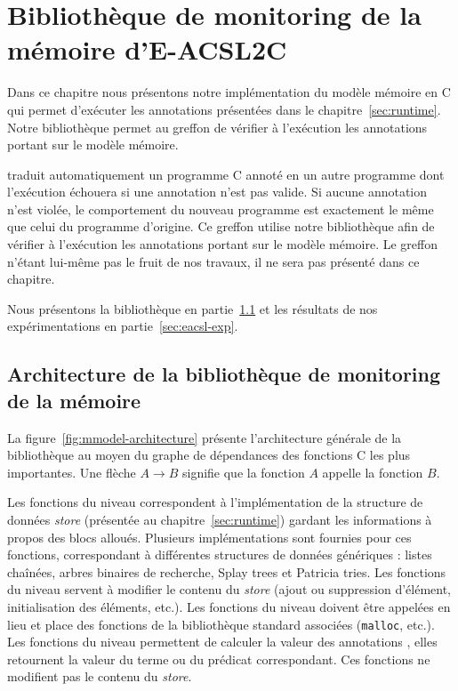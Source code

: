 
\chapter{Bibliothèque de monitoring de la mémoire d'E-ACSL2C}
\label{sec:eacsl}

\chapterintro


Dans ce chapitre nous présentons notre implémentation du modèle mémoire en C
qui permet d'exécuter les annotations \eacsl présentées dans
le chapitre~\ref{sec:runtime}.
Notre bibliothèque permet au greffon \eacsltoc de vérifier à l'exécution les
annotations \eacsl portant sur le modèle mémoire.

\eacsltoc traduit automatiquement un programme C annoté en un autre
programme dont l'exécution échouera si une annotation n'est pas valide.
Si aucune annotation n'est violée, le comportement
du nouveau programme est exactement le même que celui du programme d'origine.
Ce greffon utilise notre bibliothèque afin de vérifier à l'exécution les
annotations \eacsl portant sur le modèle mémoire.
Le greffon \eacsltoc n'étant lui-même pas le fruit de nos travaux, il ne sera
pas présenté dans ce chapitre.

Nous présentons la bibliothèque en partie~\ref{sec:eacsl-impl} et les résultats
de nos expérimentations en partie~\ref{sec:eacsl-exp}.


\section{Architecture de la bibliothèque de monitoring de la mémoire}
\label{sec:eacsl-impl}


La figure~\ref{fig:mmodel-architecture} présente l'architecture générale de la
bibliothèque au moyen du graphe de dépendances des fonctions C les plus
importantes.
Une flèche $A \rightarrow B$ signifie que la fonction $A$ appelle la fonction
$B$.

Les fonctions du niveau  correspondent à l'implémentation de la
structure de données {\em store} (présentée au chapitre~\ref{sec:runtime})
gardant les informations à propos des blocs alloués.
Plusieurs implémentations sont fournies pour ces fonctions, correspondant à
différentes structures de données génériques : listes chaînées, arbres binaires
de recherche, Splay trees et Patricia tries.
Les fonctions du niveau  servent à modifier le contenu du {\em store}
(ajout ou suppression d'élément, initialisation des éléments, etc.).
Les fonctions du niveau  doivent être appelées en lieu et place des
fonctions de la bibliothèque standard associées (\lstinline'malloc', etc.).
Les fonctions du niveau  permettent de calculer la valeur des
annotations \eacsl, elles retournent la valeur du terme ou du prédicat \eacsl
correspondant.
Ces fonctions ne modifient pas le contenu du {\em store}.

